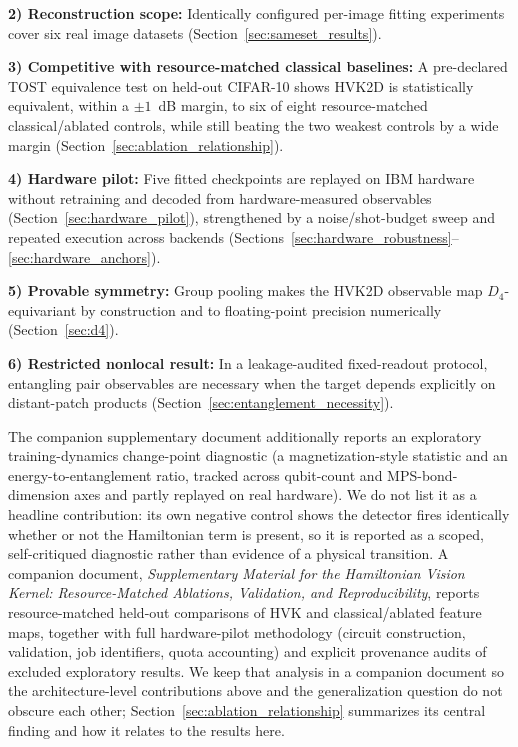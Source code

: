 \documentclass[11pt]{article}
\begin{document}
\noindent\textbf{2) Reconstruction scope:} Identically configured per-image fitting experiments cover six real image datasets (Section~\ref{sec:sameset_results}).

\noindent\textbf{3) Competitive with resource-matched classical baselines:} A pre-declared TOST equivalence test on held-out CIFAR-10 shows HVK2D is statistically equivalent, within a $\pm1$~dB margin, to six of eight resource-matched classical/ablated controls, while still beating the two weakest controls by a wide margin (Section~\ref{sec:ablation_relationship}).

\noindent\textbf{4) Hardware pilot:} Five fitted checkpoints are replayed on IBM hardware without retraining and decoded from hardware-measured observables (Section~\ref{sec:hardware_pilot}), strengthened by a noise/shot-budget sweep and repeated execution across backends (Sections~\ref{sec:hardware_robustness}--\ref{sec:hardware_anchors}).

\noindent\textbf{5) Provable symmetry:} Group pooling makes the HVK2D observable map $D_4$-equivariant by construction and to floating-point precision numerically (Section~\ref{sec:d4}).

\noindent\textbf{6) Restricted nonlocal result:} In a leakage-audited fixed-readout protocol, entangling pair observables are necessary when the target depends explicitly on distant-patch products (Section~\ref{sec:entanglement_necessity}).

The companion supplementary document additionally reports an exploratory training-dynamics change-point diagnostic (a magnetization-style statistic and an energy-to-entanglement ratio, tracked across qubit-count and MPS-bond-dimension axes and partly replayed on real hardware). We do not list it as a headline contribution: its own negative control shows the detector fires identically whether or not the Hamiltonian term is present, so it is reported as a scoped, self-critiqued diagnostic rather than evidence of a physical transition.
A companion document, \textit{Supplementary Material for the Hamiltonian Vision Kernel: Resource-Matched Ablations, Validation, and Reproducibility}, reports resource-matched held-out comparisons of HVK and classical/ablated feature maps, together with full hardware-pilot methodology (circuit construction, validation, job identifiers, quota accounting) and explicit provenance audits of excluded exploratory results. We keep that analysis in a companion document so the architecture-level contributions above and the generalization question do not obscure each other; Section~\ref{sec:ablation_relationship} summarizes its central finding and how it relates to the results here.
\end{document}
